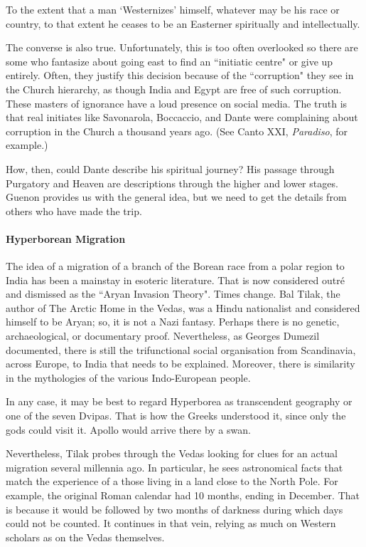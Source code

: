 \begin{quotex}
To the extent that a man `Westernizes' himself, whatever may be his race or country, to that extent he ceases to be an Easterner spiritually and intellectually. 

\end{quotex}
The converse is also true. Unfortunately, this is too often overlooked so there are some who fantasize about going east to find an ``initiatic centre" or give up entirely. Often, they justify this decision because of the ``corruption" they see in the Church hierarchy, as though India and Egypt are free of such corruption. These masters of ignorance have a loud presence on social media. The truth is that real initiates like Savonarola, Boccaccio, and Dante were complaining about corruption in the Church a thousand years ago. (See Canto XXI, \emph{Paradiso}, for example.)

How, then, could Dante describe his spiritual journey? His passage through Purgatory and Heaven are descriptions through the higher and lower stages. Guenon provides us with the general idea, but we need to get the details from others who have made the trip.

\paragraph{Hyperborean Migration}
The idea of a migration of a branch of the Borean race from a polar region to India has been a mainstay in esoteric literature. That is now considered outré and dismissed as the ``Aryan Invasion Theory". Times change. Bal Tilak, the author of The Arctic Home in the Vedas, was a Hindu nationalist and considered himself to be Aryan; so, it is not a Nazi fantasy. Perhaps there is no genetic, archaeological, or documentary proof. Nevertheless, as Georges Dumezil documented, there is still the trifunctional social organisation from Scandinavia, across Europe, to India that needs to be explained. Moreover, there is similarity in the mythologies of the various Indo-European people.

In any case, it may be best to regard Hyperborea as transcendent geography or one of the seven Dvipas. That is how the Greeks understood it, since only the gods could visit it. Apollo would arrive there by a swan.

Nevertheless, Tilak probes through the Vedas looking for clues for an actual migration several millennia ago. In particular, he sees astronomical facts that match the experience of a those living in a land close to the North Pole. For example, the original Roman calendar had 10 months, ending in December. That is because it would be followed by two months of darkness during which days could not be counted. It continues in that vein, relying as much on Western scholars as on the Vedas themselves.

